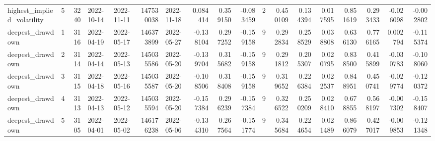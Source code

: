 \begin{tabular}{lrrllrlrrrrrrrrrrr}
highest\_implied\_volatility & 5 & 3240 & 2022-10-14 & 2022-11-11 & 147530038 & 2022-11-18 & 0.084414 & 0.359150 & -0.083459 & 2 & 0.450109 & 0.134394 & 0.017595 & 0.851619 & 0.293433 & -0.026098 & -0.002802 \\
deepest\_drawdown & 1 & 3116 & 2022-04-19 & 2022-05-17 & 146373899 & 2022-05-27 & -0.138104 & 0.297252 & -0.159158 & 9 & 0.292834 & 0.258529 & 0.038808 & 0.636130 & 0.776165 & 0.002794 & -0.115374 \\
deepest\_drawdown & 2 & 3114 & 2022-04-14 & 2022-05-13 & 145035586 & 2022-05-20 & -0.139704 & 0.315682 & -0.159158 & 9 & 0.291812 & 0.205307 & 0.020795 & 0.838500 & 0.415899 & -0.030783 & -0.108060 \\
deepest\_drawdown & 3 & 3115 & 2022-04-18 & 2022-05-16 & 145035587 & 2022-05-20 & -0.108506 & 0.318408 & -0.159158 & 9 & 0.319652 & 0.226384 & 0.022537 & 0.848951 & 0.450741 & -0.029774 & -0.120372 \\
deepest\_drawdown & 4 & 3113 & 2022-04-13 & 2022-05-12 & 145035594 & 2022-05-20 & -0.157384 & 0.296239 & -0.157384 & 9 & 0.326522 & 0.250209 & 0.028410 & 0.678855 & 0.568197 & -0.007302 & -0.158407 \\
deepest\_drawdown & 5 & 3105 & 2022-04-01 & 2022-05-02 & 146176238 & 2022-05-06 & -0.134310 & 0.267564 & -0.151774 & 9 & 0.345684 & 0.224654 & 0.021489 & 0.866079 & 0.427017 & -0.009853 & -0.121348 \\
\bottomrule
\end{tabular}
